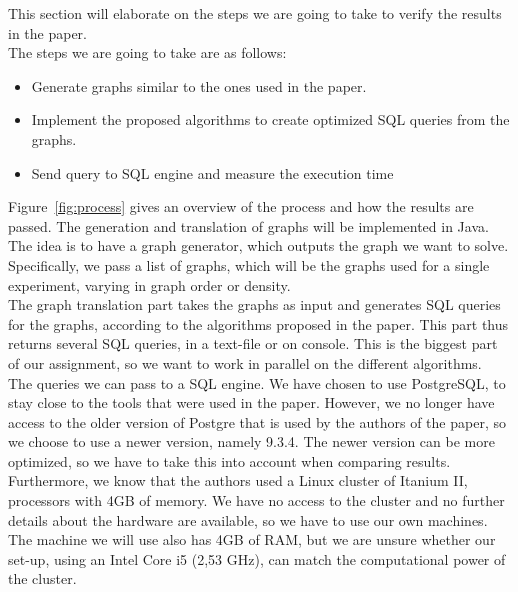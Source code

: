 This section will elaborate on the steps we are going to take to verify the results in the paper.\\

\noindent The steps we are going to take are as follows:

\begin{itemize}
	\item Generate graphs similar to the ones used in the paper.
	\item Implement the proposed algorithms to create optimized SQL queries from the graphs.
	\item Send query to SQL engine and measure the execution time
\end{itemize}

\noindent Figure~\ref{fig:process} gives an overview of the process and how the results are passed. The generation and translation of graphs will be implemented in Java. The idea is to have a graph generator, which outputs the graph we want to solve. Specifically, we pass a list of graphs, which will be the graphs used for a single experiment, varying in graph order or density. \\

The graph translation part takes the graphs as input and generates SQL queries for the graphs, according to the algorithms proposed in the paper. This part thus returns several SQL queries, in a text-file or on console. This is the biggest part of our assignment, so we want to work in parallel on the different algorithms. \\

The queries we can pass to a SQL engine. We have chosen to use PostgreSQL, to stay close to the tools that were used in the paper. However, we no longer have access to the older version of Postgre that is used by the authors of the paper, so we choose to use a newer version, namely 9.3.4.
The newer version can be more optimized, so we have to take this into account when comparing results. Furthermore, we know that the authors used a Linux cluster of Itanium II, processors with 4GB of memory. We have no access to the cluster and no further details about the hardware are available, so we have to use our own machines. The machine we will use also has 4GB of RAM, but we are unsure whether our set-up, using an Intel Core i5 (2,53 GHz), can match the computational power of the cluster. 

